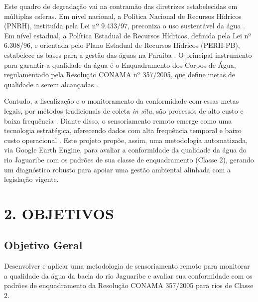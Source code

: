 \documentclass[12pt, a4paper]{article}
\begin{document}
Este quadro de degradação vai na contramão das diretrizes estabelecidas em múltiplas esferas. Em nível nacional, a Política Nacional de Recursos Hídricos (PNRH), instituída pela Lei nº 9.433/97, preconiza o uso sustentável da água \cite{pnrh1997}. Em nível estadual, a Política Estadual de Recursos Hídricos, definida pela Lei nº 6.308/96, e orientada pelo Plano Estadual de Recursos Hídricos (PERH-PB), estabelece as bases para a gestão das águas na Paraíba \cite{paraiba1996, perhPB}. O principal instrumento para garantir a qualidade da água é o Enquadramento dos Corpos de Água, regulamentado pela Resolução CONAMA nº 357/2005, que define metas de qualidade a serem alcançadas \cite{conama357}.

Contudo, a fiscalização e o monitoramento da conformidade com essas metas legais, por métodos tradicionais de coleta \textit{in situ}, são processos de alto custo e baixa frequência \cite{moraes2023}. Diante disso, o sensoriamento remoto emerge como uma tecnologia estratégica, oferecendo dados com alta frequência temporal e baixo custo operacional \cite{moraes2023}. Este projeto propõe, assim, uma metodologia automatizada, via Google Earth Engine, para avaliar a conformidade da qualidade da água do rio Jaguaribe com os padrões de sua classe de enquadramento (Classe 2), gerando um diagnóstico robusto para apoiar uma gestão ambiental alinhada com a legislação vigente.


\section*{2. OBJETIVOS}
\subsection*{Objetivo Geral}
Desenvolver e aplicar uma metodologia de sensoriamento remoto para monitorar a qualidade da água da bacia do rio Jaguaribe e avaliar sua conformidade com os padrões de enquadramento da Resolução CONAMA 357/2005 para rios de Classe 2.
\end{document}
